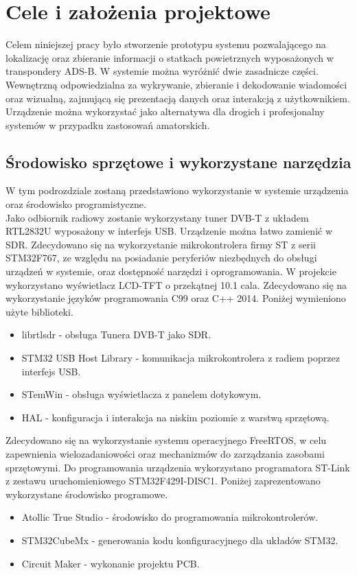\documentclass[eng,printmode]{mgr}
\begin{document}
\chapter{ Cele i założenia projektowe }
Celem niniejszej pracy było stworzenie prototypu systemu pozwalającego na lokalizację oraz zbieranie informacji o  statkach powietrznych wyposażonych w transpondery ADS-B. W systemie można wyróżnić dwie zasadnicze części.
Wewnętrzną odpowiedzialna za wykrywanie, zbieranie i dekodowanie wiadomości oraz wizualną, zajmującą się prezentacją danych oraz interakcją z użytkownikiem. Urządzenie można wykorzystać jako alternatywa dla drogich i profesjonalny systemów w przypadku zastosowań amatorskich.

\section{Środowisko sprzętowe i wykorzystane narzędzia}
W tym podrozdziale zostaną przedstawiono wykorzystanie w systemie urządzenia oraz środowisko programistyczne.
\\
Jako odbiornik radiowy zostanie wykorzystany tuner DVB-T z układem RTL2832U wyposażony w interfejs USB. Urządzenie można łatwo zamienić w SDR. Zdecydowano się na wykorzystanie mikrokontrolera firmy ST z serii STM32F767, ze względu na posiadanie peryferiów niezbędnych do obsługi urządzeń w systemie, oraz dostępność narzędzi i oprogramowania. W projekcie wykorzystano wyświetlacz LCD-TFT o przekątnej 10.1 cala.
Zdecydowano się na wykorzystanie języków programowania C99 oraz C++ 2014.
Poniżej wymieniono użyte biblioteki.
\begin{itemize}
  \item librtlsdr - obsługa Tunera DVB-T jako SDR.
  \item STM32 USB Host Library - komunikacja mikrokontrolera z radiem poprzez interfejs USB.
  \item STemWin - obsługa wyświetlacza z panelem dotykowym.
  \item HAL - konfiguracja i interakcja na niskim poziomie z warstwą sprzętową.
\end{itemize}


Zdecydowano się na wykorzystanie systemu operacyjnego FreeRTOS, w celu zapewnienia wielozadaniowości oraz mechanizmów do zarządzania zasobami sprzętowymi. Do programowania urządzenia wykorzystano programatora ST-Link z zestawu uruchomieniowego STM32F429I-DISC1. Poniżej zaprezentowano wykorzystane środowisko programowe.

\begin{itemize}
  \item Atollic True Studio - środowisko do programowania mikrokontrolerów.
  \item STM32CubeMx - generowania kodu konfiguracyjnego dla układów STM32.
  \item Circuit Maker - wykonanie projektu PCB.
\end{itemize}
\end{document}
